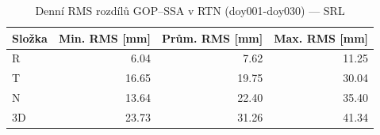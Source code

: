 \begin{table}[H]
\centering
\caption{Denní RMS rozdílů GOP–SSA v RTN (doy001-doy030) — SRL}
\label{tab:gop_vs_ssa_srl_doy001-doy030_rms}
\begin{tabular}{lrrr}
\toprule
Složka & Min. RMS [mm] & Prům. RMS [mm] & Max. RMS [mm] \\
\midrule
R & 6.04 & 7.62 & 11.25 \\
T & 16.65 & 19.75 & 30.04 \\
N & 13.64 & 22.40 & 35.40 \\
3D & 23.73 & 31.26 & 41.34 \\
\bottomrule
\end{tabular}
\end{table}
